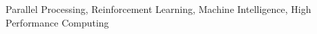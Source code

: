 \begin{IEEEkeywords}
Parallel Processing, Reinforcement Learning, Machine Intelligence, High Performance Computing
\end{IEEEkeywords}
%
\begin{acronym}[Bash]
\end{acronym}
